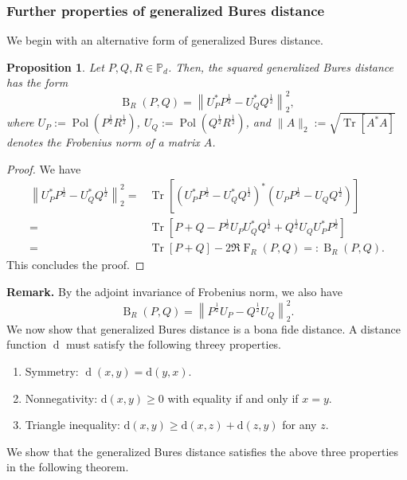 \documentclass[12pt]{article}
\newtheorem{prop}[theorem]{Proposition}
\theoremstyle{definition}
\begin{document}
\subsubsection{Further properties of generalized Bures distance}

We begin with an alternative form of generalized Bures distance.
\begin{theorembox}
\begin{prop} \label{Thm:GBRAlternativeForm}
    Let $P,Q,R \in \mathbb P_d$. Then, the squared generalized Bures distance has the form 
    \begin{equation}
        \operatorname{B}_R(P,Q) = \left\| U^*_P P^{\frac12}  - U^*_Q Q ^{\frac12} \right\|_2^2,
    \end{equation}
    where $U_P := \operatorname{Pol}\left(P^{\frac12}  R ^{\frac12} \right)$, $U_Q := \operatorname{Pol}\left(Q ^{\frac12} R ^{\frac12} \right)$, and $\|A\|_2 := \sqrt{\operatorname{Tr}[A^*A]}$ denotes the Frobenius norm of a matrix $A$. 
\end{prop}
\end{theorembox}
\begin{proof}
We have
\begin{equation}
\begin{aligned}
        \left\| U^*_P P^{\frac12}  - U_Q^* Q ^{\frac12} \right\|_2^2 = &\operatorname{Tr}\left[ (U_P^* P^{\frac12}  - U_Q^* Q ^{\frac12})^* (U_P P^{\frac12}  - U_Q Q ^{\frac12}) \right] \\
        = &\operatorname{Tr} \left[P + Q - P^{\frac12} U_P U_Q^* Q^{\frac12}  + Q ^{\frac12} U_Q U_P^* P^{\frac12}  \right] \\ 
        = &\operatorname{Tr}[P+Q]  -2 \Re \operatorname{F}_R(P,Q) =: \operatorname{B}_R(P,Q).   
\end{aligned}
\end{equation}
This concludes the proof.
\end{proof}

\textbf{Remark.} By the adjoint invariance of Frobenius norm, we also have 
\begin{equation}
    \operatorname{B}_R(P,Q) =  \left\| P^{\frac12}  U_P - Q ^{\frac12} U_Q\right\|_2^2.
\end{equation}
We now show that generalized Bures distance is a bona fide distance. A distance function $\operatorname{d}$ must satisfy the following threey properties.
\begin{enumerate}
    \item Symmetry: $\operatorname{d}(x,y) = \text{d}(y,x)$.
    \item Nonnegativity: $\text{d}(x,y) \geq 0 $ with equality if and only if $x =y$.
    \item Triangle inequality: $\text{d}(x,y) \geq \text{d}(x,z) + \text{d}(z,y)$ for any $z$. 
\end{enumerate}
We show that the generalized Bures distance satisfies the above three properties in the following theorem.
\end{document}
